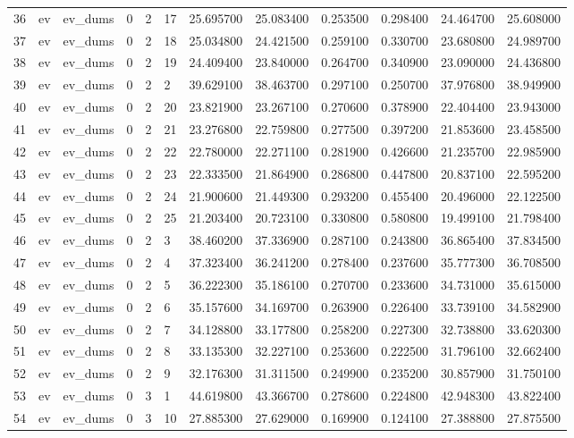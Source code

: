 \begin{tabular}{llllllrrrrrr}
36 & ev & ev_dums & 0 & 2 & 17 & 25.695700 & 25.083400 & 0.253500 & 0.298400 & 24.464700 & 25.608000 \\
37 & ev & ev_dums & 0 & 2 & 18 & 25.034800 & 24.421500 & 0.259100 & 0.330700 & 23.680800 & 24.989700 \\
38 & ev & ev_dums & 0 & 2 & 19 & 24.409400 & 23.840000 & 0.264700 & 0.340900 & 23.090000 & 24.436800 \\
39 & ev & ev_dums & 0 & 2 & 2 & 39.629100 & 38.463700 & 0.297100 & 0.250700 & 37.976800 & 38.949900 \\
40 & ev & ev_dums & 0 & 2 & 20 & 23.821900 & 23.267100 & 0.270600 & 0.378900 & 22.404400 & 23.943000 \\
41 & ev & ev_dums & 0 & 2 & 21 & 23.276800 & 22.759800 & 0.277500 & 0.397200 & 21.853600 & 23.458500 \\
42 & ev & ev_dums & 0 & 2 & 22 & 22.780000 & 22.271100 & 0.281900 & 0.426600 & 21.235700 & 22.985900 \\
43 & ev & ev_dums & 0 & 2 & 23 & 22.333500 & 21.864900 & 0.286800 & 0.447800 & 20.837100 & 22.595200 \\
44 & ev & ev_dums & 0 & 2 & 24 & 21.900600 & 21.449300 & 0.293200 & 0.455400 & 20.496000 & 22.122500 \\
45 & ev & ev_dums & 0 & 2 & 25 & 21.203400 & 20.723100 & 0.330800 & 0.580800 & 19.499100 & 21.798400 \\
46 & ev & ev_dums & 0 & 2 & 3 & 38.460200 & 37.336900 & 0.287100 & 0.243800 & 36.865400 & 37.834500 \\
47 & ev & ev_dums & 0 & 2 & 4 & 37.323400 & 36.241200 & 0.278400 & 0.237600 & 35.777300 & 36.708500 \\
48 & ev & ev_dums & 0 & 2 & 5 & 36.222300 & 35.186100 & 0.270700 & 0.233600 & 34.731000 & 35.615000 \\
49 & ev & ev_dums & 0 & 2 & 6 & 35.157600 & 34.169700 & 0.263900 & 0.226400 & 33.739100 & 34.582900 \\
50 & ev & ev_dums & 0 & 2 & 7 & 34.128800 & 33.177800 & 0.258200 & 0.227300 & 32.738800 & 33.620300 \\
51 & ev & ev_dums & 0 & 2 & 8 & 33.135300 & 32.227100 & 0.253600 & 0.222500 & 31.796100 & 32.662400 \\
52 & ev & ev_dums & 0 & 2 & 9 & 32.176300 & 31.311500 & 0.249900 & 0.235200 & 30.857900 & 31.750100 \\
53 & ev & ev_dums & 0 & 3 & 1 & 44.619800 & 43.366700 & 0.278600 & 0.224800 & 42.948300 & 43.822400 \\
54 & ev & ev_dums & 0 & 3 & 10 & 27.885300 & 27.629000 & 0.169900 & 0.124100 & 27.388800 & 27.875500 \\

\end{tabular}
